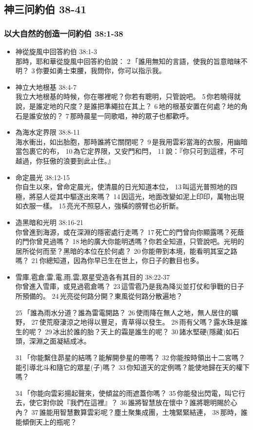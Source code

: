 \subsection{神三问約伯 38-41}
\subsubsection{以大自然的创造一问約伯 38:1-38}
\begin{itemize}
\itemsep-.45em
\item 神從旋風中回答約伯 38:1-3\\
那時，耶和華從旋風中回答約伯說： 2 「誰用無知的言語，使我的旨意暗昧不明？ 3 你要如勇士束腰，我問你，你可以指示我。
\item 神立大地根基 38:4-7\\
我立大地根基的時候，你在哪裡呢？你若有聰明，只管說吧。 5 你若曉得就說，是誰定地的尺度？是誰把準繩拉在其上？ 6 地的根基安置在何處？地的角石是誰安放的？ 7 那時晨星一同歌唱，神的眾子也都歡呼。
\item 為海水定界限 38:8-11\\
海水衝出，如出胎胞，那時誰將它關閉呢？ 9 是我用雲彩當海的衣服，用幽暗當包裹它的布， 10 為它定界限，又安門和閂， 11 說：『你只可到這裡，不可越過，你狂傲的浪要到此止住。』
\item 命定晨光 38:12-15\\
你自生以來，曾命定晨光，使清晨的日光知道本位， 13 叫這光普照地的四極，將惡人從其中驅逐出來嗎？ 14 因這光，地面改變如泥上印印，萬物出現如衣服一樣。 15 亮光不照惡人，強橫的膀臂也必折斷。
\item 造黑暗和光明 38:16-21 \\
你曾進到海源，或在深淵的隱密處行走嗎？ 17 死亡的門曾向你顯露嗎？死蔭的門你曾見過嗎？ 18 地的廣大你能明透嗎？你若全知道，只管說吧。光明的居所從何而至？黑暗的本位在於何處？ 20 你能帶到本境，能看明其室之路嗎？ 21 你總知道，因為你早已生在世上，你日子的數目也多。 
\item 雪庫,雹倉,雷,電,雨,雲,眾星受造各有其目的 38:22-37\\
你曾進入雪庫，或見過雹倉嗎？ 23 這雪雹乃是我為降災並打仗和爭戰的日子所預備的。 24 光亮從何路分開？東風從何路分散遍地？

25 「誰為雨水分道？誰為雷電開路？ 26 使雨降在無人之地，無人居住的曠野， 27 使荒廢淒涼之地得以豐足，青草得以發生。 28 雨有父嗎？露水珠是誰生的呢？ 29 冰出於誰的胎？天上的霜是誰生的呢？ 30 諸水堅硬(隱藏)如石頭，深淵之面凝結成冰。

31 「你能繫住昴星的結嗎？能解開參星的帶嗎？ 32 你能按時領出十二宮嗎？能引導北斗和隨它的眾星(子)嗎？ 33 你知道天的定例嗎？能使地歸在天的權下嗎？

34 「你能向雲彩揚起聲來，使傾盆的雨遮蓋你嗎？ 35 你能發出閃電，叫它行去，使它對你說『我們在這裡』？ 36 誰將智慧放在懷中？誰將聰明賜於心內？ 37 誰能用智慧數算雲彩呢？塵土聚集成團，土塊緊緊結連， 38 那時，誰能傾倒天上的瓶呢？
\end{itemize}

